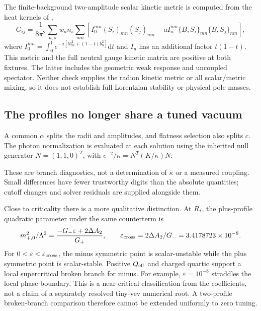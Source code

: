 \documentclass[11pt,letterpaper]{article}
\newcommand{\dd}{\mathrm d}\newcommand{\Lam}{\Lambda}\newcommand{\B}{\mathcal B}\newcommand{\HH}{\mathcal H}
\begin{document}
The finite-background two-amplitude scalar kinetic metric is computed from the heat kernels of \cite{exact},
\begin{equation}
 G_{ij}=\frac1{8\pi^2}\sum_{a,s}w_an_s\sum_{mn}
 [I_0^{mn}(S_i)_{mn}(S_j)_{nm}-aI_u^{mn}\{B,S_i\}_{mn}\{B,S_j\}_{nm}],
\end{equation}
where $I_0^{mn}=\int_0^1e^{-a[tb_m^2+(1-t)b_n^2]}\dd t$ and $I_u$ has an additional factor $t(1-t)$. This metric and the full neutral gauge kinetic matrix are positive at both fixtures. The latter includes the geometric weak response and uncoupled spectator. Neither check supplies the radion kinetic metric or all scalar/metric mixing, so it does not establish full Lorentzian stability or physical pole masses.

\subsection{The profiles no longer share a tuned vacuum}

A common $\alpha$ splits the radii and amplitudes, and flatness selection also splits $c$. The photon normalization is evaluated at each solution using the inherited null generator $N=(1,1,0)^T$, with $e^{-2}/\kappa=N^T(K/\kappa)N$:
\begin{center}\small\DifferenceTable\end{center}
These are branch diagnostics, not a determination of $\kappa$ or a measured coupling. Small differences have fewer trustworthy digits than the absolute quantities; cutoff changes and solver residuals are supplied alongside them.

Close to criticality there is a more qualitative distinction. At $R_*$, the plus-profile quadratic parameter under the same counterterm is
\begin{equation}
 m_{+,0}^2/\Lam^2=\frac{-G_-\varepsilon+2\Delta A_2}{G_+},\qquad
 \varepsilon_{\rm cross}=2\Delta A_2/G_-=\EpsilonCross.
\end{equation}
For $0<\varepsilon<\varepsilon_{\rm cross}$, the minus symmetric point is scalar-unstable while the plus symmetric point is scalar-stable. Positive $Q_{\rm eff}$ and charged quartic support a local supercritical broken branch for minus. For example, $\varepsilon=10^{-8}$ straddles the local phase boundary. This is a near-critical classification from the coefficients, not a claim of a separately resolved tiny-vev numerical root. A two-profile broken-branch comparison therefore cannot be extended uniformly to zero tuning.
\end{document}
